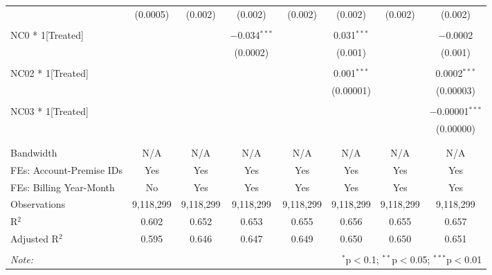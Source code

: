 \begin{table}[!htbp]
\begin{tabular}{@{\extracolsep{5pt}}lccccccc}
  & (0.0005) & (0.002) & (0.002) & (0.002) & (0.002) & (0.002) & (0.002) \\ 
  & & & & & & & \\ 
 NC0 * 1[Treated] &  &  & $-$0.034$^{***}$ &  & 0.031$^{***}$ &  & $-$0.0002 \\ 
  &  &  & (0.0002) &  & (0.001) &  & (0.001) \\ 
  & & & & & & & \\ 
 NC02 * 1[Treated] &  &  &  &  & 0.001$^{***}$ &  & 0.0002$^{***}$ \\ 
  &  &  &  &  & (0.00001) &  & (0.00003) \\ 
  & & & & & & & \\ 
 NC03 * 1[Treated] &  &  &  &  &  &  & $-$0.00001$^{***}$ \\ 
  &  &  &  &  &  &  & (0.00000) \\ 
  & & & & & & & \\ 
\hline \\[-1.8ex] 
Bandwidth & N/A & N/A & N/A & N/A & N/A & N/A & N/A \\ 
FEs: Account-Premise IDs & Yes & Yes & Yes & Yes & Yes & Yes & Yes \\ 
FEs: Billing Year-Month & No & Yes & Yes & Yes & Yes & Yes & Yes \\ 
Observations & 9,118,299 & 9,118,299 & 9,118,299 & 9,118,299 & 9,118,299 & 9,118,299 & 9,118,299 \\ 
R$^{2}$ & 0.602 & 0.652 & 0.653 & 0.655 & 0.656 & 0.655 & 0.657 \\ 
Adjusted R$^{2}$ & 0.595 & 0.646 & 0.647 & 0.649 & 0.650 & 0.650 & 0.651 \\ 
\hline 
\hline \\[-1.8ex] 
\textit{Note:}  & \multicolumn{7}{r}{$^{*}$p$<$0.1; $^{**}$p$<$0.05; $^{***}$p$<$0.01} \\ 
\end{tabular} 
\end{table} 
